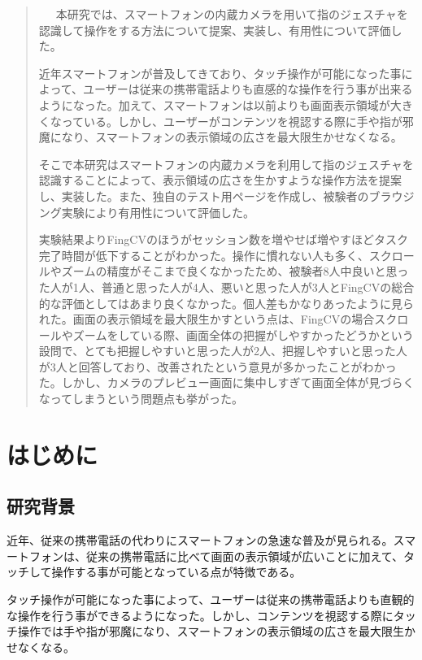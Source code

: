 \documentclass[11pt,a4j, titlepage]{jarticle} %
\begin{document}
\begin{abstract}
	\ \ \ 本研究では、スマートフォンの内蔵カメラを用いて指のジェスチャを認識して操作をする方法について提案、実装し、有用性について評価した。

	近年スマートフォンが普及してきており、タッチ操作が可能になった事によって、ユーザーは従来の携帯電話よりも直感的な操作を行う事が出来るようになった。加えて、スマートフォンは以前よりも画面表示領域が大きくなっている。しかし、ユーザーがコンテンツを視認する際に手や指が邪魔になり、スマートフォンの表示領域の広さを最大限生かせなくなる。

	そこで本研究はスマートフォンの内蔵カメラを利用して指のジェスチャを認識することによって、表示領域の広さを生かすような操作方法を提案し、実装した。また、独自のテスト用ページを作成し、被験者のブラウジング実験により有用性について評価した。

	実験結果よりFingCVのほうがセッション数を増やせば増やすほどタスク完了時間が低下することがわかった。操作に慣れない人も多く、スクロールやズームの精度がそこまで良くなかったため、被験者8人中良いと思った人が1人、普通と思った人が4人、悪いと思った人が3人とFingCVの総合的な評価としてはあまり良くなかった。個人差もかなりあったように見られた。画面の表示領域を最大限生かすという点は、FingCVの場合スクロールやズームをしている際、画面全体の把握がしやすかったどうかという設問で、とても把握しやすいと思った人が2人、把握しやすいと思った人が3人と回答しており、改善されたという意見が多かったことがわかった。しかし、カメラのプレビュー画面に集中しすぎて画面全体が見づらくなってしまうという問題点も挙がった。

\end{abstract}

\tableofcontents
\newpage
\listoffigures
\newpage
\listoftables
\newpage
\section{はじめに}
\subsection{研究背景}
近年、従来の携帯電話の代わりにスマートフォンの急速な普及が見られる。スマートフォンは、従来の携帯電話に比べて画面の表示領域が広いことに加えて、タッチして操作する事が可能となっている点が特徴である。

タッチ操作が可能になった事によって、ユーザーは従来の携帯電話よりも直観的な操作を行う事ができるようになった。しかし、コンテンツを視認する際にタッチ操作では手や指が邪魔になり、スマートフォンの表示領域の広さを最大限生かせなくなる。
\end{document}
